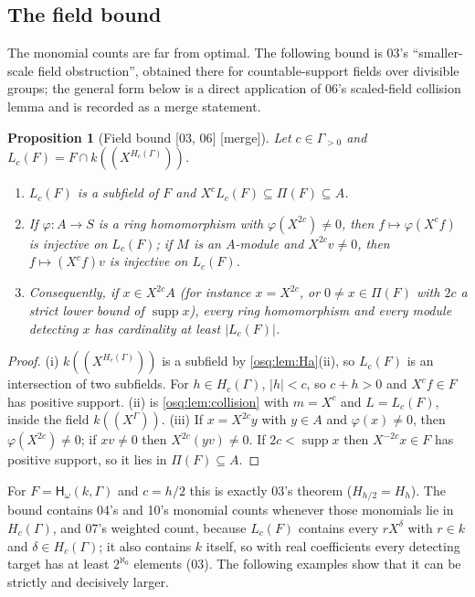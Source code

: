 \documentclass[11pt,letterpaper]{article}
\numberwithin{equation}{section}
\newtheorem{proposition}[proposition]{Proposition}
\theoremstyle{definition}
\theoremstyle{remark}
\theoremstyle{plain}
\newcommand{\hahn}[2]{#1(\!(X^{#2})\!)}
\newcommand{\Hc}[2]{\mathsf H_{\omega}(#1,#2)}
\newcommand{\supp}{\operatorname{supp}}
\newcommand{\src}[1]{\textup{\textsf{[#1]}}}
\newcommand{\merge}{\textup{\textsf{[merge]}}}
\begin{document}
\subsection{The field bound}\label{osq:sub:fieldbound}

The monomial counts are far from optimal. The following bound is 03's ``smaller-scale field
obstruction'', obtained there for countable-support fields over divisible groups; the general
form below is a direct application of 06's scaled-field collision lemma and is recorded as a
merge statement.

\begin{proposition}[Field bound \src{03, 06} \merge]\label{osq:prop:fieldbound}
Let $c\in\Gamma_{>0}$ and $L_c(F)=F\cap\hahn k{H_c(\Gamma)}$.
\begin{enumerate}
\item $L_c(F)$ is a subfield of $F$ and $X^cL_c(F)\subseteq\Pi(F)\subseteq A$.
\item If $\varphi:A\to S$ is a ring homomorphism with $\varphi(X^{2c})\neq0$, then
$f\mapsto\varphi(X^cf)$ is injective on $L_c(F)$; if $M$ is an $A$-module and
$X^{2c}v\ne0$, then $f\mapsto(X^cf)v$ is injective on $L_c(F)$.
\item Consequently, if $x\in X^{2c}A$ (for instance $x=X^{2c}$, or $0\ne x\in\Pi(F)$ with
$2c$ a strict lower bound of $\supp x$), every ring homomorphism and every module detecting
$x$ has cardinality at least $|L_c(F)|$.
\end{enumerate}
\end{proposition}
\begin{proof}
(i) $\hahn k{H_c(\Gamma)}$ is a subfield by \cref{osq:lem:Ha}(ii), so $L_c(F)$ is an
intersection of two subfields. For $h\in H_c(\Gamma)$, $|h|<c$, so $c+h>0$ and
$X^cf\in F$ has positive support. (ii) is \cref{osq:lem:collision} with $m=X^c$ and
$L=L_c(F)$, inside the field $\hahn k\Gamma$. (iii) If $x=X^{2c}y$ with $y\in A$ and
$\varphi(x)\ne0$, then $\varphi(X^{2c})\ne0$; if $xv\ne0$ then $X^{2c}(yv)\ne0$. If $2c<\supp x$
then $X^{-2c}x\in F$ has positive support, so it lies in $\Pi(F)\subseteq A$.
\end{proof}

For $F=\Hc{k}{\Gamma}$ and $c=h/2$ this is exactly 03's theorem ($H_{h/2}=H_h$). The bound
contains 04's and 10's monomial counts whenever those monomials lie in $H_c(\Gamma)$, and
07's weighted count, because $L_c(F)$ contains every $rX^\delta$ with $r\in k$ and
$\delta\in H_c(\Gamma)$; it also contains $k$ itself, so with real coefficients every detecting
target has at least $2^{\aleph_0}$ elements (03). The following examples show that it can be
strictly and decisively larger.
\end{document}
